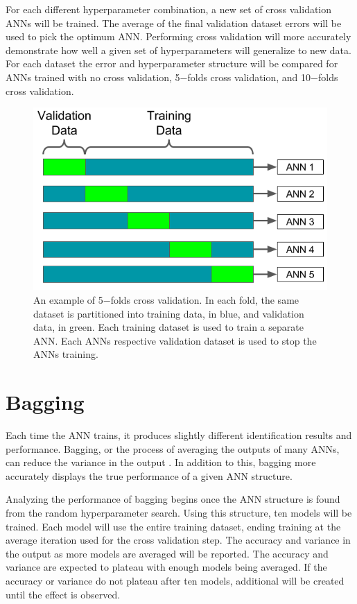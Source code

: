 \documentclass[tocnosub,noragright,centerchapter,12pt,fullpage]{uiucecethesis09}
\begin{document}
For each different hyperparameter combination, a new set of cross validation ANNs will be trained. The average of the final validation dataset errors will be used to pick the optimum ANN. Performing cross validation will more accurately demonstrate how well a given set of hyperparameters will generalize to new data. For each dataset the error and hyperparameter structure will be compared for ANNs trained with no cross validation, 5$-$folds cross validation, and 10$-$folds cross validation.



\begin{figure}[H]
\centering
\includegraphics[width=0.6\linewidth]{images/kfolds_example}
\caption{An example of 5$-$folds cross validation. In each fold, the same dataset is partitioned into training data, in blue, and validation data, in green. Each training dataset is used to train a separate ANN. Each ANNs respective validation dataset is used to stop the ANNs training.}
\label{fig:kfolds_example}
\end{figure}




\section{Bagging} \label{Bagging}
Each time the ANN trains, it produces slightly different identification results and performance. Bagging, or the process of averaging the outputs of many ANNs, can reduce the variance in the output \cite{Breiman1996}. In addition to this, bagging more accurately displays the true performance of a given ANN structure.

Analyzing the performance of bagging begins once the ANN structure is found from the random hyperparameter search. Using this structure, ten models will be trained. Each model will use the entire training dataset, ending training at the average iteration used for the cross validation step. The accuracy and variance in the output as more models are averaged will be reported. The accuracy and variance are expected to plateau with enough models being averaged. If the accuracy or variance do not plateau after ten models, additional will be created until the effect is observed.
\end{document}
